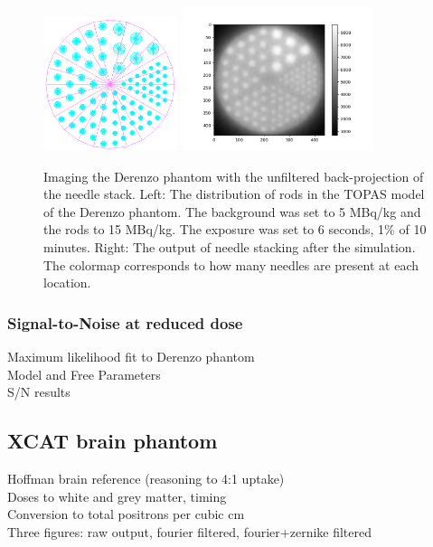\documentclass[12pt]{article}
\begin{document}
\begin{figure}[!ht]
\centering
\includegraphics[angle=0,width=0.35\textwidth]{Figures/Derenzo_Truth_Focused_v1.png}
\hfil
\includegraphics[width=0.5\textwidth]{Figures/Derenzo_6s_no_filter_v1.png}
\caption{Imaging the Derenzo phantom with the unfiltered back-projection of the needle stack. Left: The distribution of rods in the TOPAS model of the Derenzo phantom. The background was set to 5 MBq/kg and the rods to 15 MBq/kg. The exposure was set to 6 seconds, 1\% of 10 minutes. Right: The output of needle stacking after the simulation. The colormap corresponds to how many needles are present at each location.}
\label{fig:Derenzo_phantom_imaging}
\end{figure}

\subsubsection{Signal-to-Noise at reduced dose}
Maximum likelihood fit to Derenzo phantom\\
    Model and Free Parameters\\
    S/N results \\


\subsection{XCAT brain phantom}
\label{XCAT_brain phantom}

Hoffman brain reference (reasoning to 4:1 uptake) \\
Doses to white and grey matter, timing \\
Conversion to total positrons per cubic cm \\
Three figures: raw output, fourier filtered, fourier+zernike filtered \\
\end{document}
